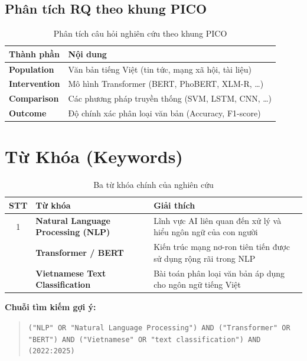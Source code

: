 \documentclass[12pt, a4paper]{article}
\begin{document}
\subsection{Phân tích RQ theo khung PICO}

\begin{table}[h!]
\centering
\begin{tabularx}{0.9\textwidth}{>{\bfseries}l X}
\toprule
Thành phần & Nội dung \\
\midrule
\textbf{P}opulation    & Văn bản tiếng Việt (tin tức, mạng xã hội, tài liệu) \\
\textbf{I}ntervention  & Mô hình Transformer (BERT, PhoBERT, XLM-R, \ldots) \\
\textbf{C}omparison    & Các phương pháp truyền thống (SVM, LSTM, CNN, \ldots) \\
\textbf{O}utcome       & Độ chính xác phân loại văn bản (Accuracy, F1-score) \\
\bottomrule
\end{tabularx}
\caption{Phân tích câu hỏi nghiên cứu theo khung PICO}
\end{table}

\section{Từ Khóa (Keywords)}

\begin{table}[h!]
\centering
\begin{tabularx}{0.85\textwidth}{c >{\bfseries}l X}
\toprule
\textbf{STT} & \textbf{Từ khóa} & \textbf{Giải thích} \\
\midrule
1 & Natural Language Processing (NLP) 
  & Lĩnh vực AI liên quan đến xử lý và hiểu ngôn ngữ của con người \\
\addlinespace
2 & Transformer / BERT 
  & Kiến trúc mạng nơ-ron tiên tiến được sử dụng rộng rãi trong NLP \\
\addlinespace
3 & Vietnamese Text Classification 
  & Bài toán phân loại văn bản áp dụng cho ngôn ngữ tiếng Việt \\
\bottomrule
\end{tabularx}
\caption{Ba từ khóa chính của nghiên cứu}
\end{table}

\noindent\textbf{Chuỗi tìm kiếm gợi ý:}
\begin{quote}
    \texttt{("NLP" OR "Natural Language Processing") AND ("Transformer" OR "BERT") 
    AND ("Vietnamese" OR "text classification") AND (2022:2025)}
\end{quote}
\end{document}
